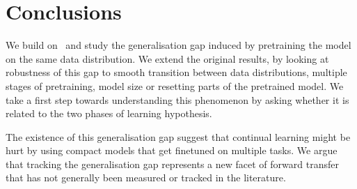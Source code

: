 \section{Conclusions}
\label{sec:future}

We build on~\cite{ash2019difficulty} and study the generalisation gap induced by pretraining the model on the same data distribution. We extend the original results, by looking at robustness of this gap to smooth transition between data distributions, multiple stages of pretraining, model size or resetting parts of the pretrained model. We take a first step towards understanding this phenomenon by asking whether it is related to the two phases of learning hypothesis. 

The existence of this generalisation gap suggest that continual learning might be hurt by using compact models that get finetuned on multiple tasks. We argue that tracking the generalisation gap represents a new facet of forward transfer that has not generally been measured or tracked in the literature.
